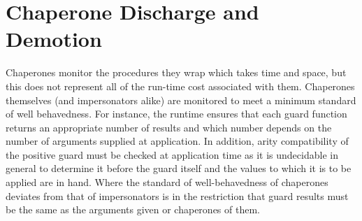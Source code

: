 \documentclass{sigplanconf}
\begin{document}





\section{Chaperone Discharge and Demotion}


Chaperones monitor the procedures they wrap which takes time and space, but this does not represent all of the run-time cost associated with them.
Chaperones themselves (and impersonators alike) are monitored to meet a minimum standard of well behavedness.
For instance, the runtime ensures that each guard function returns an appropriate number of results and which number depends on the number of arguments supplied at application.
In addition, arity compatibility of the positive guard must be checked at application time as it is undecidable in general to determine it before the guard itself and the values to which it is to be applied are in hand.
Where the standard of well-behavedness of chaperones deviates from that of impersonators is in the restriction that guard results must be the same as the arguments given or chaperones of them.
\end{document}
